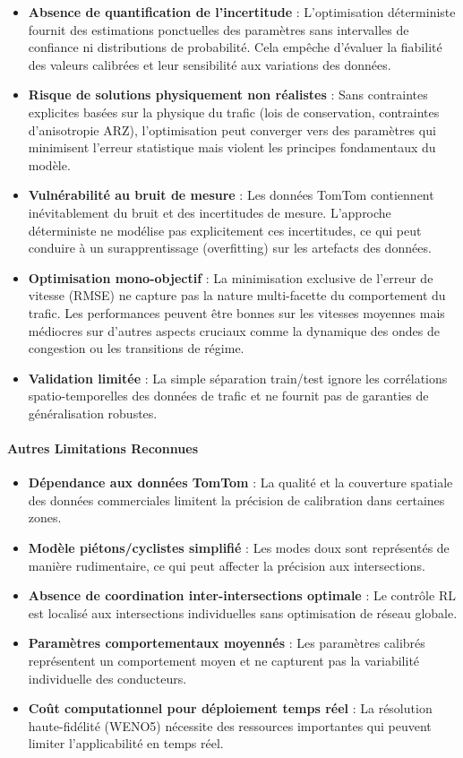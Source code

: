 \begin{itemize}
    \item \textbf{Absence de quantification de l'incertitude} : L'optimisation déterministe fournit des estimations ponctuelles des paramètres sans intervalles de confiance ni distributions de probabilité. Cela empêche d'évaluer la fiabilité des valeurs calibrées et leur sensibilité aux variations des données.
    \item \textbf{Risque de solutions physiquement non réalistes} : Sans contraintes explicites basées sur la physique du trafic (lois de conservation, contraintes d'anisotropie ARZ), l'optimisation peut converger vers des paramètres qui minimisent l'erreur statistique mais violent les principes fondamentaux du modèle.
    \item \textbf{Vulnérabilité au bruit de mesure} : Les données TomTom contiennent inévitablement du bruit et des incertitudes de mesure. L'approche déterministe ne modélise pas explicitement ces incertitudes, ce qui peut conduire à un surapprentissage (overfitting) sur les artefacts des données.
    \item \textbf{Optimisation mono-objectif} : La minimisation exclusive de l'erreur de vitesse (RMSE) ne capture pas la nature multi-facette du comportement du trafic. Les performances peuvent être bonnes sur les vitesses moyennes mais médiocres sur d'autres aspects cruciaux comme la dynamique des ondes de congestion ou les transitions de régime.
    \item \textbf{Validation limitée} : La simple séparation train/test ignore les corrélations spatio-temporelles des données de trafic et ne fournit pas de garanties de généralisation robustes.
\end{itemize}

\paragraph{Autres Limitations Reconnues}
\begin{itemize}
    \item \textbf{Dépendance aux données TomTom} : La qualité et la couverture spatiale des données commerciales limitent la précision de calibration dans certaines zones.
    \item \textbf{Modèle piétons/cyclistes simplifié} : Les modes doux sont représentés de manière rudimentaire, ce qui peut affecter la précision aux intersections.
    \item \textbf{Absence de coordination inter-intersections optimale} : Le contrôle RL est localisé aux intersections individuelles sans optimisation de réseau globale.
    \item \textbf{Paramètres comportementaux moyennés} : Les paramètres calibrés représentent un comportement moyen et ne capturent pas la variabilité individuelle des conducteurs.
    \item \textbf{Coût computationnel pour déploiement temps réel} : La résolution haute-fidélité (WENO5) nécessite des ressources importantes qui peuvent limiter l'applicabilité en temps réel.
\end{itemize}

